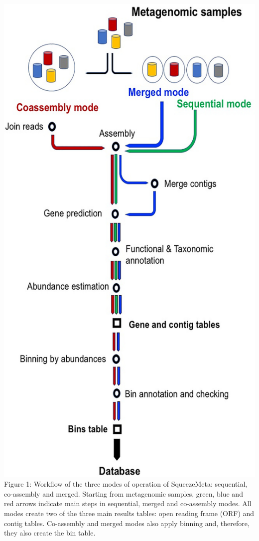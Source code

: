 \documentclass[
]{book}
\begin{document}
\includegraphics[width=1\textwidth,height=\textheight]{./Figures/SqueezeMeta_workflow.png}
Figure 1: Workflow of the three modes of operation of SqueezeMeta: sequential, co-assembly and merged. Starting from metagenomic samples, green, blue and red arrows indicate main steps in sequential, merged and co-assembly modes. All modes create two of the three main results tables: open reading frame (ORF) and contig tables. Co-assembly and merged modes also apply binning and, therefore, they also create the bin table.
\end{document}
